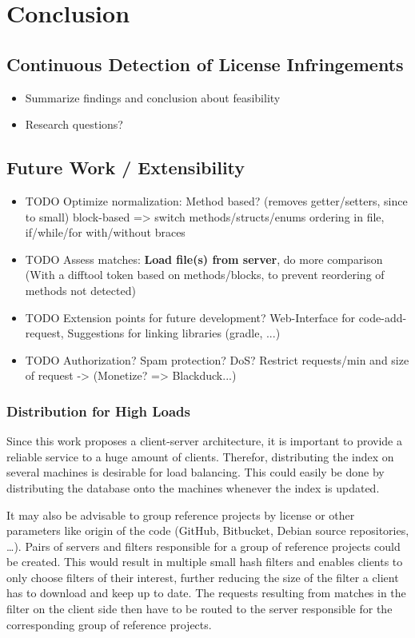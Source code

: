 
\chapter{Conclusion}\label{chapter:conclusion}

\section{Continuous Detection of License Infringements}
\begin{itemize}
	\item Summarize findings and conclusion about feasibility
	\item Research questions?
\end{itemize}

\section{Future Work / Extensibility}\label{section:approach/extensibility}
\begin{itemize}
	\item TODO Optimize normalization: Method based? (removes getter/setters, since to small) block-based => switch methods/structs/enums ordering in file, if/while/for with/without braces
	\item TODO Assess matches: \textbf{Load file(s) from server}, do more comparison (With a difftool token based on methods/blocks, to prevent reordering of methods not detected)
	\item TODO Extension points for future development? Web-Interface for code-add-request, Suggestions for linking libraries (gradle, ...)
	\item TODO Authorization? Spam protection? DoS? Restrict requests/min and size of request -> (Monetize? => Blackduck...)
\end{itemize}

\subsection{Distribution for High Loads}
Since this work proposes a client-server architecture, it is important to provide a reliable service to a huge amount of clients.
Therefor, distributing the index on several machines is desirable for load balancing.
This could easily be done by distributing the database onto the machines whenever the index is updated.

It may also be advisable to group reference projects by license or other parameters like origin of the code (GitHub, Bitbucket, Debian source repositories, \dots).
Pairs of servers and filters responsible for a group of reference projects could be created.
This would result in multiple small hash filters and enables clients to only choose filters of their interest, further reducing the size of the filter a client has to download and keep up to date.
The requests resulting from matches in the filter on the client side then have to be routed to the server responsible for the corresponding group of reference projects.

